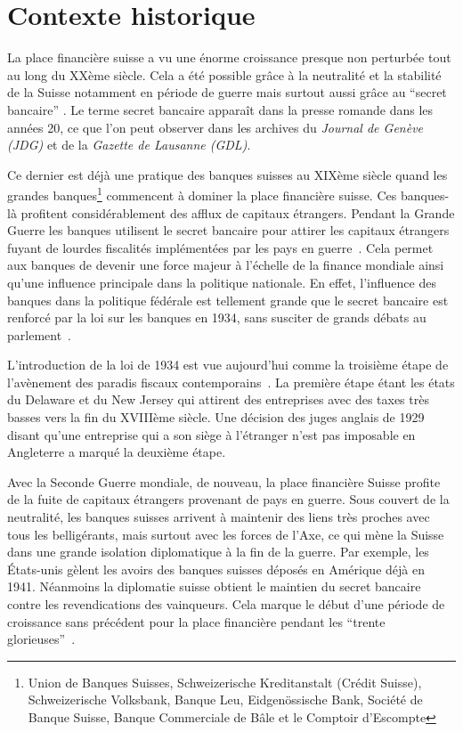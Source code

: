 \documentclass[a4paper, 11pt]{article}
\begin{document}
\section{Contexte historique}

La place financière suisse a vu une énorme croissance presque non perturbée tout
au long du XXème siècle. Cela a été possible grâce à la neutralité et la
stabilité de la Suisse notamment en période de guerre mais surtout aussi grâce
au  ``secret bancaire'' \citep[p. 512]{Mazbouri12}. 
Le terme secret bancaire apparaît dans la presse romande dans les années 20,
ce que l'on peut observer dans les archives du \textit{Journal de Genève (JDG)} et 
de la \textit{Gazette de Lausanne (GDL)}.

Ce dernier est déjà une
pratique des banques suisses au XIXème siècle quand les grandes
banques\footnote{Union de Banques Suisses, Schweizerische Kreditanstalt (Crédit
Suisse), Schweizerische Volksbank, Banque Leu, Eidgenössische Bank, Société de
Banque Suisse, Banque Commerciale de Bâle et le Comptoir d’Escompte} commencent
à dominer la place financière suisse. Ces banques-là profitent considérablement
des afflux de capitaux étrangers. Pendant la Grande Guerre les banques utilisent
le secret bancaire pour attirer les capitaux étrangers fuyant de lourdes
fiscalités implémentées par les pays en guerre~\citep[p. 484-486]{Mazbouri12}.
Cela permet aux banques de devenir une force majeur à l’échelle de la finance
mondiale ainsi qu’une influence principale dans la politique nationale.
En effet, l’influence des banques dans la politique fédérale est tellement
grande que le secret bancaire est renforcé par la loi sur les banques en 1934,
sans susciter de grands débats au parlement~\citep{Guex99}.


L'introduction de la loi de 1934 est vue aujourd'hui comme la troisième étape de
l'avènement des paradis fiscaux contemporains~\citep[p. 29]{Chavagneux12}. La
première étape étant les états du Delaware et du New Jersey qui attirent des
entreprises avec des taxes très basses vers la fin du XVIIIème siècle. Une
décision des juges anglais de 1929 disant qu'une entreprise qui a son siège à
l'étranger n'est pas imposable en Angleterre a marqué la deuxième étape.


Avec la Seconde Guerre mondiale, de nouveau, la place financière Suisse profite
de la fuite de capitaux étrangers provenant de pays en guerre. Sous couvert de
la neutralité, les banques suisses arrivent à maintenir des liens très proches
avec tous les belligérants, mais surtout avec les forces de l’Axe, ce qui mène
la Suisse dans une grande isolation diplomatique à la fin de la guerre. Par
exemple, les États-unis gèlent les avoirs des banques suisses déposés en
Amérique déjà en 1941. Néanmoins la diplomatie suisse obtient le maintien du
secret bancaire contre les revendications des vainqueurs. Cela marque le début
d’une période de croissance sans précédent pour la place financière pendant les
 ``trente glorieuses''~\citep[p. 495]{Mazbouri12}.
\end{document}
